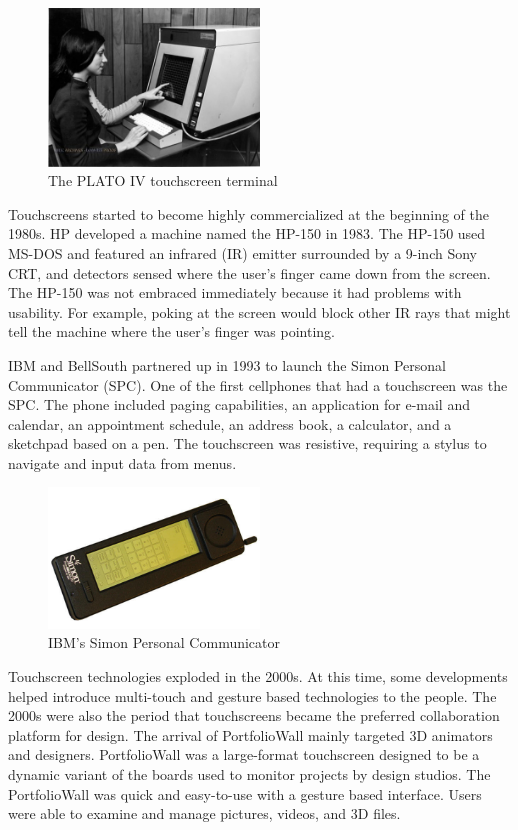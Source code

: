 \documentclass{article}
\begin{document}
\begin{figure}[!ht]
    \caption{The PLATO IV touchscreen terminal}
    \label{image:PLATOIV}
    \centering
    \includegraphics[width=0.5\textwidth]{pics/plato_iv.jpg}
\end{figure}

Touchscreens started to become highly commercialized at the beginning of the 1980s. HP developed a machine named the HP-150 in 1983. The HP-150 used MS-DOS and featured an infrared (IR) emitter surrounded by a 9-inch Sony CRT, and detectors sensed where the user’s finger came down from the screen. The HP-150 was not embraced immediately because it had problems with usability. For example, poking at the screen would block other IR rays that might tell the machine where the user's finger was pointing.

IBM and BellSouth partnered up in 1993 to launch the Simon Personal Communicator (SPC). One of the first cellphones that had a touchscreen was the SPC. The phone included paging capabilities, an application for e-mail and calendar, an appointment schedule, an address book, a calculator, and a sketchpad based on a pen. The touchscreen was resistive, requiring a stylus to navigate and input data from menus.
\cite{ref8}

\begin{figure}[!ht]
    \caption{IBM's Simon Personal Communicator}
    \label{image:SPC}
    \centering
    \includegraphics[width=0.5\textwidth]{pics/IBM_Simon.jpeg}
\end{figure}

Touchscreen technologies exploded in the 2000s. At this time, some developments helped introduce multi-touch and gesture based technologies to the people. The 2000s were also the period that touchscreens became the preferred collaboration platform for design. The arrival of PortfolioWall mainly targeted 3D animators and designers. PortfolioWall was a large-format touchscreen designed to be a dynamic variant of the boards used to monitor projects by design studios. The PortfolioWall was quick and easy-to-use with a gesture based interface. Users were able to examine and manage pictures, videos, and 3D files.
\cite{ref8}
\end{document}

